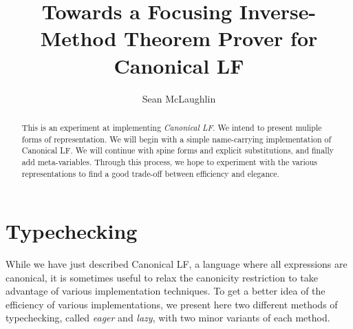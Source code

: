 \documentclass[11pt,twoside]{article}
\title{Towards a Focusing Inverse-Method Theorem Prover for Canonical LF}
\author{Sean McLaughlin}
\begin{document}
 
\maketitle

\arraycolsep=12pt


\begin{abstract} 
This is an experiment at implementing \emph{Canonical LF}.  We intend
to present muliple forms of representation.  We will begin with a
simple name-carrying implementation of Canonical LF.  We will continue
with spine forms and explicit substitutions, and finally add
meta-variables.  Through this process, we hope to experiment with the
various representations to find a good trade-off between efficiency
and elegance.
\end{abstract} 



\section{Typechecking}

While we have just described Canonical LF, a language where all
expressions are canonical, it is sometimes useful to relax the canonicity
restriction to take advantage of various implementation 
techniques.  To get a better idea of the efficiency of various
implementations, we present here two different methods of
typechecking, called \emph{eager} and \emph{lazy}, with
two minor variants of each method.








\end{document}
